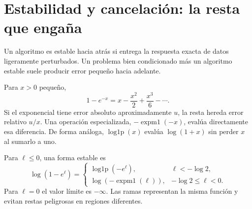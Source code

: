 \documentclass[11pt,a4paper]{article}
\theoremstyle{definition}
\DeclareMathOperator{\expmone}{expm1}
\DeclareMathOperator{\logonep}{log1p}
\newcounter{problema}
\begin{document}
\section{Estabilidad y cancelación: la resta que engaña}
Un algoritmo es estable hacia atrás si entrega la respuesta exacta de datos ligeramente perturbados. Un problema bien condicionado más un algoritmo estable suele producir error pequeño hacia adelante.

Para $x>0$ pequeño,
\[
1-e^{-x}=x-\frac{x^2}2+\frac{x^3}6-\cdots.
\]
Si el exponencial tiene error absoluto aproximadamente $u$, la resta hereda error relativo $u/x$. Una operación especializada, $-\expmone(-x)$, evalúa directamente esa diferencia. De forma análoga, $\logonep(x)$ evalúa $\log(1+x)$ sin perder $x$ al sumarlo a uno.

Para $\ell\le0$, una forma estable es
\[
\log(1-e^\ell)=
\begin{cases}
\logonep(-e^\ell),&\ell<-\log2,\\
\log(-\expmone(\ell)),&-\log2\le\ell<0.
\end{cases}
\]
Para $\ell=0$ el valor límite es $-\infty$. Las ramas representan la misma función y evitan restas peligrosas en regiones diferentes.
\end{document}
